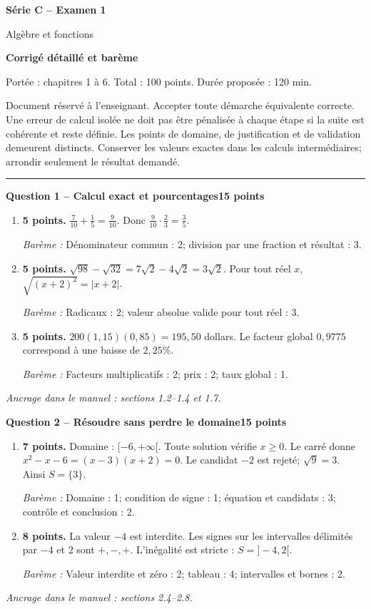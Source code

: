 \documentclass[11pt,a4paper]{article}
\begin{document}
{\LARGE\bfseries Série C -- Examen 1}\par
{\large Algèbre et fonctions}\par
\textbf{Corrigé détaillé et barème}\par
Portée : chapitres 1 à 6. Total : 100 points. Durée proposée : 120 min.\par
\small Document réservé à l’enseignant. Accepter toute démarche équivalente correcte. Une erreur de calcul isolée ne doit pas être pénalisée à chaque étape si la suite est cohérente et reste définie. Les points de domaine, de justification et de validation demeurent distincts. Conserver les valeurs exactes dans les calculs intermédiaires; arrondir seulement le résultat demandé.\normalsize\par
\vspace{3mm}\hrule\vspace{4mm}
{\large\bfseries Question 1 -- Calcul exact et pourcentages}\hfill\textbf{15 points}\par
\begin{enumerate}
\item \textbf{5 points.} \(\frac7{10}+\frac15=\frac9{10}\). Donc \(\frac9{10}\cdot\frac23=\frac35\).
\par{\small\textit{Barème : }Dénominateur commun : 2; division par une fraction et résultat : 3.}
\item \textbf{5 points.} \(\sqrt{98}-\sqrt{32}=7\sqrt2-4\sqrt2=3\sqrt2\). Pour tout réel \(x\), \(\sqrt{(x+2)^2}=|x+2|\).
\par{\small\textit{Barème : }Radicaux : 2; valeur absolue valide pour tout réel : 3.}
\item \textbf{5 points.} \(200(1{,}15)(0{,}85)=195{,}50\) dollars. Le facteur global \(0{,}9775\) correspond à une baisse de \(2{,}25\%\).
\par{\small\textit{Barème : }Facteurs multiplicatifs : 2; prix : 2; taux global : 1.}
\end{enumerate}
\vfill {\small\textit{Ancrage dans le manuel : sections 1.2--1.4 et 1.7.}}

\newpage
{\large\bfseries Question 2 -- Résoudre sans perdre le domaine}\hfill\textbf{15 points}\par
\begin{enumerate}
\item \textbf{7 points.} Domaine : \([-6,+\infty[\). Toute solution vérifie \(x\ge0\). Le carré donne \(x^2-x-6=(x-3)(x+2)=0\). Le candidat \(-2\) est rejeté; \(\sqrt9=3\). Ainsi \(S=\{3\}\).
\par{\small\textit{Barème : }Domaine : 1; condition de signe : 1; équation et candidats : 3; contrôle et conclusion : 2.}
\item \textbf{8 points.} La valeur \(-4\) est interdite. Les signes sur les intervalles délimités par \(-4\) et \(2\) sont \(+, -, +\). L’inégalité est stricte : \(S=]-4,2[\).
\par{\small\textit{Barème : }Valeur interdite et zéro : 2; tableau : 4; intervalles et bornes : 2.}
\end{enumerate}
\vfill {\small\textit{Ancrage dans le manuel : sections 2.4--2.8.}}
\end{document}
